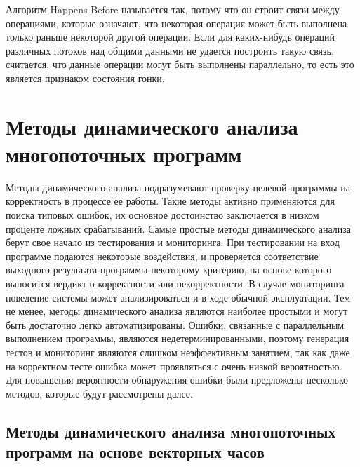 Алгоритм Happens-Before называется так, потому что он строит связи между операциями, которые означают, что некоторая операция может быть выполнена только раньше некоторой другой операции.
Если для каких-нибудь операций различных потоков над общими данными не удается построить такую связь, считается, что данные операции могут быть выполнены параллельно, то есть это является признаком состояния гонки.


\section{Методы динамического анализа многопоточных программ}
\label{rw:dynamic}

Методы динамического анализа подразумевают проверку целевой программы на корректность в процессе ее работы.
Такие методы активно применяются для поиска типовых ошибок, их основное достоинство заключается в низком проценте ложных срабатываний.
Самые простые методы динамического анализа берут свое начало из тестирования и мониторинга.
При тестировании на вход программе подаются некоторые воздействия, и проверяется соответствие выходного результата программы некоторому критерию, на основе которого выносится вердикт о корректности или некорректности.
В случае мониторинга поведение системы может анализироваться и в ходе обычной эксплуатации.
Тем не менее, методы динамического анализа являются наиболее простыми и могут быть достаточно легко автоматизированы.
Ошибки, связанные с параллельным выполнением программы, являются недетерминированными, поэтому генерация тестов и мониторинг являются слишком неэффективным занятием, так как даже на корректном тесте ошибка может проявляться с очень низкой вероятностью.
Для повышения вероятности обнаружения ошибки были предложены несколько методов, которые будут рассмотрены далее.

\subsection{Методы динамического анализа многопоточных программ на основе векторных часов}


